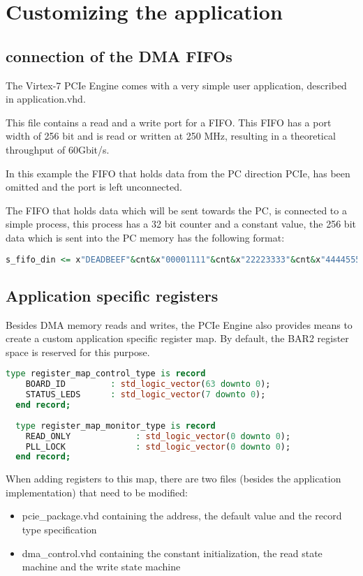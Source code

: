 \section{Customizing the application}
\subsection{connection of the DMA FIFOs}
The Virtex-7 PCIe Engine comes with a very simple user application, described in application.vhd.

This file contains a read and a write port for a FIFO. This FIFO has a port width of 256 bit and is read or written at 250 MHz, resulting in a theoretical throughput of 60Gbit/s.

In this example the FIFO that holds data from the PC direction PCIe, has been omitted and the port is left unconnected.

The FIFO that holds data which will be sent towards the PC, is connected to a simple process, this process has a 32 bit counter and a constant value, the 256 bit data which is sent into the PC memory has the following format:

\begin{lstlisting}[language=VHDL, frame=single, caption=Data format of example application]
s_fifo_din <= x"DEADBEEF"&cnt&x"00001111"&cnt&x"22223333"&cnt&x"44445555"&cnt;
\end{lstlisting}
\newpage
\subsection{Application specific registers}
Besides DMA memory reads and writes, the PCIe Engine also provides means to create a custom application specific register map. By default, the BAR2 register space is reserved for this purpose.

\begin{lstlisting}[language=VHDL, frame=single, caption=custom register types]
  type register_map_control_type is record
    BOARD_ID         : std_logic_vector(63 downto 0);    
    STATUS_LEDS      : std_logic_vector(7 downto 0);
  end record;
  
  type register_map_monitor_type is record
    READ_ONLY             : std_logic_vector(0 downto 0);    
    PLL_LOCK              : std_logic_vector(0 downto 0);    
  end record;
\end{lstlisting}

When adding registers to this map, there are two files (besides the application implementation) that need to be modified:
\begin{itemize}
 \item{pcie\_package.vhd} containing the address, the default value and the record type specification
 \item{dma\_control.vhd} containing the constant initialization, the read state machine and the write state machine
\end{itemize}

